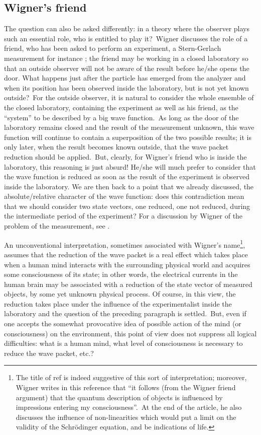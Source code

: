 \documentclass[12pt,onecolumn]{article}%
\begin{document}
\subsection{Wigner's friend}

\label{Wigner}

The question can also be asked differently: in a theory where the observer
plays such an essential role, who is entitled to play it?\ Wigner discusses
the role of a friend, who has been asked to perform an experiment, a
Stern-Gerlach measurement for instance \cite{Wigner-friend}; the friend may be
working in a closed laboratory so that an outside observer will not be aware
of the result before he/she opens the door. What happens just after the
particle has emerged from the analyzer and when its position has been observed
inside the laboratory, but is not yet known outside?\ For the outside
observer, it is natural to consider the whole ensemble of the closed
laboratory, containing the experiment as well as his friend, as the ``system''
to be described by a big wave function.\ As long as the door of the laboratory
remains closed and the result of the measurement unknown, this wave function
will continue to contain a superposition of the two possible results; it is
only later, when the result becomes known outside, that the wave packet
reduction should be applied.\ But, clearly, for Wigner's friend who is inside
the laboratory, this reasoning is just absurd! He/she will much prefer to
consider that the wave function is reduced as soon as the result of the
experiment is observed inside the laboratory. We are then back to a point that
we already discussed, the absolute/relative character of the wave function:
does this contradiction mean that we should consider two state vectors, one
reduced, one not reduced, during the intermediate period of the experiment?
For a discussion by Wigner of the problem of the measurement, see
\cite{Wigner1}.

An unconventional interpretation, sometimes associated with Wigner's
name\footnote{The title of ref \cite{Wigner-friend} is indeed suggestive of
this sort of interpretation; moreover, Wigner writes in this reference that
``it follows (from the Wigner friend argument) that the quantum description of
objects is influenced by impressions entering my consciousness''.\ At the end
of the article, he also discusses the influence of non-linearities which would
put a limit on the validity of the Schr\"{o}dinger equation, and be
indications of life.}, assumes that the reduction of the wave packet is a real
effect which takes place when a human mind interacts with the surrounding
physical world and acquires some consciousness of its state; in other words,
the electrical currents in the human brain may be associated with a reduction
of the state vector of measured objects, by some yet unknown physical process.
Of course, in this view, the reduction takes place under the influence of the
experimentalist inside the laboratory and the question of the preceding
paragraph is settled.\ But, even if one accepts the somewhat provocative idea
of possible action of the mind (or consciousness) on the environment, this
point of view does not suppress all logical difficulties: what is a human
mind, what level of consciousness is necessary to reduce the wave packet, etc.?
\end{document}

